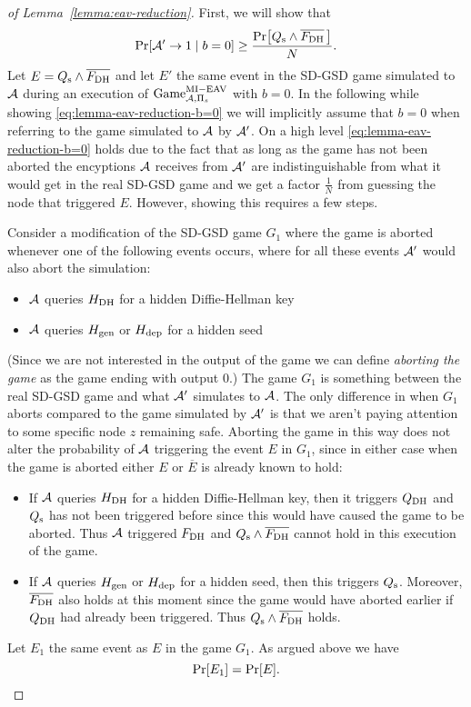 \begin{proof}[of Lemma~\ref{lemma:eav-reduction}]
	First, we will show that
	\begin{equation} \label{eq:lemma-eav-reduction-b=0}
		\pr{\adv' \to 1 \mid b = 0} \ge \frac{\pr{\qs \land \overline{\fdh}\,}}{N}.
	\end{equation}
	Let $E = Q_\mathrm{s} \land \overline{F_\mathrm{DH}}$ and let $E'$ the same event in the SD-GSD game simulated to $\mathcal{A}$ during an execution of $\mathrm{Game}_{\mathcal{A}, \Pi_s}^{\mathrm{MI-EAV}}$ with $b = 0$. In the following while showing \eqref{eq:lemma-eav-reduction-b=0} we will implicitly assume that $b = 0$ when referring to the game simulated to $\mathcal{A}$ by $\mathcal{A}'$.
	On a high level \eqref{eq:lemma-eav-reduction-b=0} holds due to the fact that as long as the game has not been aborted the encyptions $\mathcal{A}$ receives from $\mathcal{A}'$ are indistinguishable from what it would get in the real SD-GSD game and we get a factor $\frac{1}{N}$ from guessing the node that triggered $E$. However, showing this requires a few steps.

	Consider a modification of the SD-GSD game $G_1$ where the game is aborted whenever one of the following events occurs, where for all these events $\mathcal{A}'$ would also abort the simulation:
	\begin{itemize}
		\item $\mathcal{A}$ queries $H_\mathrm{DH}$ for a hidden Diffie-Hellman key
		\item $\mathcal{A}$ queries $H_\mathrm{gen}$ or $H_\mathrm{dep}$ for a hidden seed
	\end{itemize}
	(Since we are not interested in the output of the game we can define \emph{aborting the game} as the game ending with output 0.) The game $G_1$ is something between the real SD-GSD game and what $\mathcal{A}'$ simulates to $\mathcal{A}$. The only difference in when $G_1$ aborts compared to the game simulated by $\mathcal{A}'$ is that we aren't paying attention to some specific node $z$ remaining safe. Aborting the game in this way does not alter the probability of $\mathcal{A}$ triggering the event $E$ in $G_1$, since in either case when the game is aborted either $E$ or $\overline{E}$ is already known to hold:
	\begin{itemize}
		\item If $\mathcal{A}$ queries $H_\mathrm{DH}$ for a hidden Diffie-Hellman key, then it triggers $Q_\mathrm{DH}$ and $Q_\mathrm{s}$ has not been triggered before since this would have caused the game to be aborted. Thus $\mathcal{A}$ triggered $F_\mathrm{DH}$ and $Q_\mathrm{s} \land \overline{F_\mathrm{DH}}$ cannot hold in this execution of the game.
		\item If $\mathcal{A}$ queries $H_\mathrm{gen}$ or $H_\mathrm{dep}$ for a hidden seed, then this triggers $Q_\mathrm{s}$. Moreover, $\overline{F_\mathrm{DH}}$ also holds at this moment since the game would have aborted earlier if $Q_\mathrm{DH}$ had already been triggered. Thus $Q_\mathrm{s} \land \overline{F_\mathrm{DH}}$ holds.
	\end{itemize}
	Let $E_1$ the same event as $E$ in the game $G_1$. As argued above we have
	\begin{equation} \label{eq:lemma-eav-reduction-E=E_1}
		\pr{E_1} = \pr{E}.
	\end{equation}



\end{proof}
